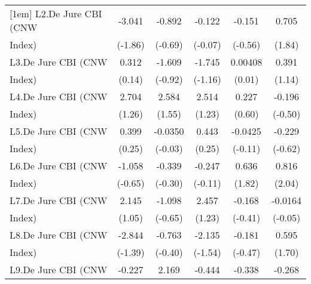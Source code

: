 {\begin{tabular}{l*{5}{c}}
[1em]
L2.De Jure CBI (CNW &      -3.041         &      -0.892         &      -0.122         &      -0.151         &       0.705         \\
Index)              &     (-1.86)         &     (-0.69)         &     (-0.07)         &     (-0.56)         &      (1.84)         \\
[1em]
L3.De Jure CBI (CNW &       0.312         &      -1.609         &      -1.745         &     0.00408         &       0.391         \\
Index)              &      (0.14)         &     (-0.92)         &     (-1.16)         &      (0.01)         &      (1.14)         \\
[1em]
L4.De Jure CBI (CNW &       2.704         &       2.584         &       2.514         &       0.227         &      -0.196         \\
Index)              &      (1.26)         &      (1.55)         &      (1.23)         &      (0.60)         &     (-0.50)         \\
[1em]
L5.De Jure CBI (CNW &       0.399         &     -0.0350         &       0.443         &     -0.0425         &      -0.229         \\
Index)              &      (0.25)         &     (-0.03)         &      (0.25)         &     (-0.11)         &     (-0.62)         \\
[1em]
L6.De Jure CBI (CNW &      -1.058         &      -0.339         &      -0.247         &       0.636         &       0.816\sym{*}  \\
Index)              &     (-0.65)         &     (-0.30)         &     (-0.11)         &      (1.82)         &      (2.04)         \\
[1em]
L7.De Jure CBI (CNW &       2.145         &      -1.098         &       2.457         &      -0.168         &     -0.0164         \\
Index)              &      (1.05)         &     (-0.65)         &      (1.23)         &     (-0.41)         &     (-0.05)         \\
[1em]
L8.De Jure CBI (CNW &      -2.844         &      -0.763         &      -2.135         &      -0.181         &       0.595         \\
Index)              &     (-1.39)         &     (-0.40)         &     (-1.54)         &     (-0.47)         &      (1.70)         \\
[1em]
L9.De Jure CBI (CNW &      -0.227         &       2.169\sym{*}  &      -0.444         &      -0.338         &      -0.268         \\

\end{tabular}}
